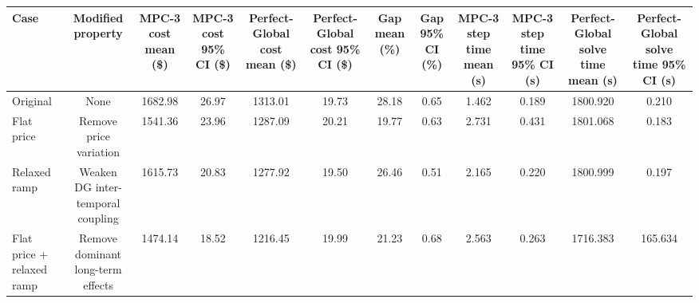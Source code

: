 \begin{tabular}{lccccccccccc}
\toprule
Case & Modified property & MPC-3 cost mean (\$) & MPC-3 cost 95\% CI (\$) & Perfect-Global cost mean (\$) & Perfect-Global cost 95\% CI (\$) & Gap mean (\%) & Gap 95\% CI (\%) & MPC-3 step time mean (s) & MPC-3 step time 95\% CI (s) & Perfect-Global solve time mean (s) & Perfect-Global solve time 95\% CI (s) \\
\midrule
Original & None & 1682.98 & 26.97 & 1313.01 & 19.73 & 28.18 & 0.65 & 1.462 & 0.189 & 1800.920 & 0.210 \\
Flat price & Remove price variation & 1541.36 & 23.96 & 1287.09 & 20.21 & 19.77 & 0.63 & 2.731 & 0.431 & 1801.068 & 0.183 \\
Relaxed ramp & Weaken DG inter-temporal coupling & 1615.73 & 20.83 & 1277.92 & 19.50 & 26.46 & 0.51 & 2.165 & 0.220 & 1800.999 & 0.197 \\
Flat price + relaxed ramp & Remove dominant long-term effects & 1474.14 & 18.52 & 1216.45 & 19.99 & 21.23 & 0.68 & 2.563 & 0.263 & 1716.383 & 165.634 \\
\bottomrule
\end{tabular}
